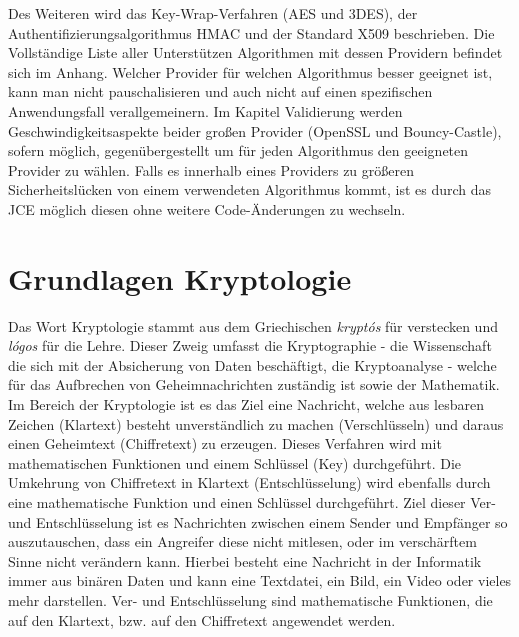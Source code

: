\documentclass[10pt, a4paper,headsepline]{scrreprt}
\begin{document}
Des Weiteren wird das Key-Wrap-Verfahren (AES und 3DES), der Authentifizierungsalgorithmus HMAC und der Standard X509 beschrieben. Die Vollständige Liste aller Unterstützen Algorithmen mit dessen Providern befindet sich im Anhang. Welcher Provider für welchen Algorithmus besser geeignet ist, kann man nicht pauschalisieren und auch nicht auf einen spezifischen Anwendungsfall verallgemeinern. Im Kapitel Validierung werden Geschwindigkeitsaspekte beider großen Provider (OpenSSL und Bouncy-Castle), sofern möglich, gegenübergestellt um für jeden Algorithmus den geeigneten Provider zu wählen. Falls es innerhalb eines Providers zu größeren Sicherheitslücken von einem verwendeten Algorithmus kommt, ist es durch das JCE möglich diesen ohne weitere Code-Änderungen zu wechseln. 


\chapter{Grundlagen Kryptologie}
Das Wort Kryptologie stammt aus dem Griechischen \textit{kryptós} für verstecken und \textit{lógos} für die Lehre. \cite{website:duden-crypto, website:duden-logie}
Dieser Zweig umfasst die Kryptographie - die Wissenschaft die sich mit der Absicherung von Daten beschäftigt, die Kryptoanalyse - welche für das Aufbrechen von Geheimnachrichten zuständig ist sowie der Mathematik.
Im Bereich der Kryptologie ist es das Ziel eine Nachricht, welche aus lesbaren Zeichen (Klartext) besteht unverständlich zu machen (Verschlüsseln) und daraus einen Geheimtext (Chiffretext) zu erzeugen. Dieses Verfahren wird mit mathematischen Funktionen und einem Schlüssel (Key) durchgeführt. Die Umkehrung von Chiffretext in Klartext (Entschlüsselung) wird ebenfalls durch eine mathematische Funktion und einen Schlüssel durchgeführt. Ziel dieser Ver- und Entschlüsselung ist es Nachrichten zwischen einem Sender und Empfänger so auszutauschen, dass ein Angreifer diese nicht mitlesen, oder im verschärftem Sinne nicht verändern kann. Hierbei besteht eine Nachricht in der Informatik immer aus binären Daten und kann eine Textdatei, ein Bild, ein Video oder vieles mehr darstellen. Ver- und Entschlüsselung sind mathematische Funktionen, die auf den Klartext, bzw. auf den Chiffretext angewendet werden. 
\end{document}
